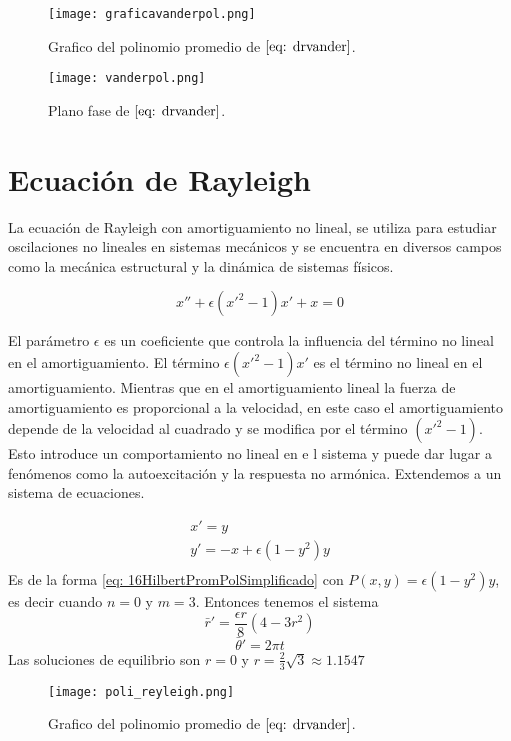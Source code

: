 \begin{figure}[h]
	\centering
	\texttt{[image: graficavanderpol.png]}
	\caption{Grafico del polinomio promedio de $\eqref{eq: drvander}$.}
\end{figure}


\begin{figure}[h]
	\centering
	\texttt{[image: vanderpol.png]}
	\caption{Plano fase de $\eqref{eq: drvander}$.}
\end{figure}


\newpage

\section{Ecuación de Rayleigh}
La ecuación de Rayleigh con amortiguamiento no lineal, se utiliza
para estudiar oscilaciones no lineales en sistemas mecánicos y se encuentra en
diversos campos como la mecánica estructural y la dinámica de sistemas físicos.

$$x''+\epsilon(x'^2-1)x'+x=0$$

El parámetro $\epsilon$ es un coeficiente que controla la influencia del término no lineal en el amortiguamiento.
El término $\epsilon(x'^2 - 1)x'$ es el término no lineal en el amortiguamiento. Mientras que en el amortiguamiento
lineal la fuerza de amortiguamiento es proporcional a la velocidad, en este caso el amortiguamiento depende de
la velocidad al cuadrado y se modifica por el término $(x'^2 - 1)$. Esto introduce un comportamiento no lineal en e
l sistema y puede dar lugar a fenómenos como la autoexcitación y la respuesta no armónica.
Extendemos a un sistema de ecuaciones.

\begin{equation}\label{eq: Rayleigh}
	\begin{matrix}
		x'=y \\
		y'=-x+\epsilon(1-y^2)y \\
	\end{matrix}
\end{equation}
Es de la forma \eqref{eq: 16HilbertPromPolSimplificado} con $P(x,y)=\epsilon(1-y^2)y$, es decir cuando $n=0$ y $m=3$.
Entonces tenemos el sistema
$$\bar{r}'=\frac{\epsilon r}{8}(4-3r^2)$$
$$\bar{\theta}'=2\pi t$$
Las soluciones de equilibrio son $r=0$ y $r=\frac{2}{3}\sqrt{3}\approx 1.1547$

\begin{figure}[h]
	\centering
	\texttt{[image: poli\_reyleigh.png]}
	\caption{Grafico del polinomio promedio de $\eqref{eq: drvander}$.}
\end{figure}

